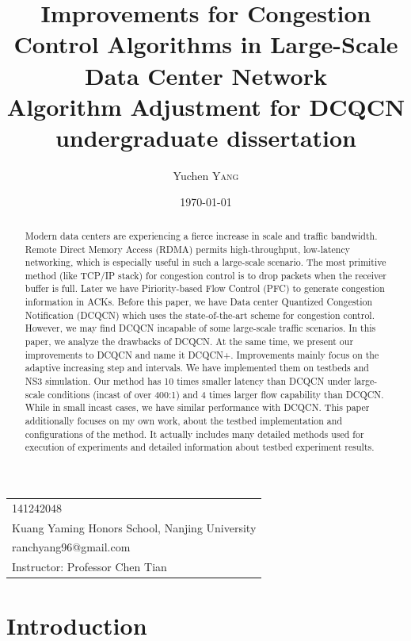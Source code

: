 \documentclass[12pt,a4paper]{article}
\title{Improvements for Congestion Control Algorithms in Large-Scale Data Center Network \\ Algorithm Adjustment for DCQCN \\ undergraduate dissertation} %
\author{Yuchen \textsc{Yang}} %
\date{\today} %
\begin{document}
\maketitle %

\begin{center}
\begin{tabular}{l}
141242048 \\
Kuang Yaming Honors School, Nanjing University \\
ranchyang96@gmail.com \\
Instructor: Professor Chen Tian
\end{tabular}
\end{center}


\begin{abstract}
	Modern data centers are experiencing a fierce increase in scale and traffic bandwidth.
	Remote Direct Memory Access (RDMA) permits high-throughput, low-latency networking,
	which is especially useful in such a large-scale scenario.
	The most primitive method (like TCP/IP stack) for congestion control is to drop packets when the receiver buffer is full.
	Later we have Piriority-based Flow Control (PFC) to generate congestion information in ACKs.
	Before this paper, we have Data center Quantized Congestion Notification (DCQCN) which uses the state-of-the-art scheme for congestion control.
	However, we may find DCQCN incapable of some large-scale traffic scenarios.
	In this paper, we analyze the drawbacks of DCQCN.
	At the same time, we present our improvements to DCQCN and name it DCQCN+.
	Improvements mainly focus on the adaptive increasing step and intervals.
	We have implemented them on testbeds and NS3 simulation.
	Our method has 10 times smaller latency than DCQCN under large-scale conditions (incast of over 400:1) and 4 times larger flow capability than DCQCN.
	While in small incast cases, we have similar performance with DCQCN.
	This paper additionally focuses on my own work, about the testbed implementation and configurations of the method.
	It actually includes many detailed methods used for execution of experiments and detailed information about testbed experiment results.
\end{abstract}

\tableofcontents

\section{Introduction}
\end{document}
